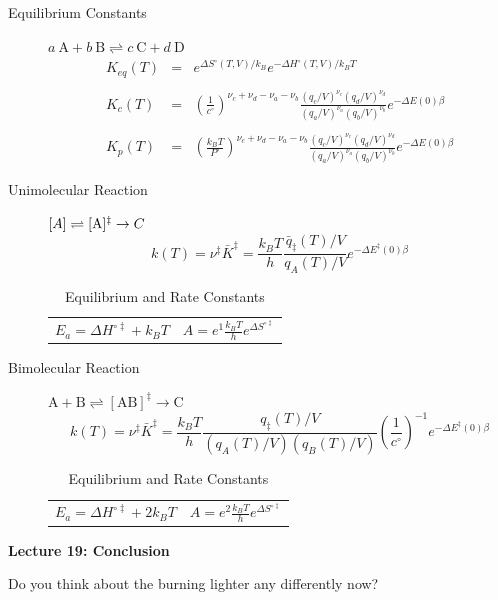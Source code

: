 \message{ !name(Outline.tex)}\documentclass[11pt]{article}
\begin{document}
\begin{outline}
\begin{table} 
\begin{center}
    \caption{\large{Equilibrium and Rate Constants}}
   \begin{description}
   \item[Equilibrium Constants] $a~\text{A} + b~\text{B} \rightleftharpoons c~\text{C} + d~\text{D} $
     \begin{eqnarray*}
       K_{eq}(T) &=& e^{\Delta S^\circ(T,V)/k_B}e^{-\Delta H^\circ(T,V)/k_BT}
       \\ \\ 
            K_c(T) &=&
          \left(\frac{1}{c^\circ}\right)^{\nu_c+\nu_d-\nu_a-\nu_b}\frac{(q_c/V)^{\nu_c}(q_d/V)^{\nu_d}}{(q_a/V)^{\nu_a}(q_b/V)^{\nu_b}}e^{-\Delta
            E(0)\beta}\\ \\
            K_p(T) &=&
          \left(\frac{k_BT}{P^\circ}\right)^{\nu_c+\nu_d-\nu_a-\nu_b}\frac{(q_c/V)^{\nu_c}(q_d/V)^{\nu_d}}{(q_a/V)^{\nu_a}(q_b/V)^{\nu_b}}e^{-\Delta
            E(0)\beta}
\end{eqnarray*}
\item[Unimolecular Reaction] $\text[A] \rightleftharpoons [\text{A} ]^\ddagger
  \rightarrow C$
      \begin{displaymath}
        k(T)=\nu^\ddagger \bar K^\ddagger=\frac{k_B T}{h} \frac{\bar{q}_\ddagger(T)/V}{q_A(T)/V}
          e^{-\Delta E^\ddagger(0)\beta}               
      \end{displaymath}
\begin{center}
      \begin{tabular}{cc}
      $ \displaystyle E_a =\Delta H^{\circ\ddagger}+k_B T $
      & $ \displaystyle A = e^1\frac{k_B T}{h} e^{\Delta S^{\circ\ddagger}} $
      \end{tabular}
\end{center}
\item[Bimolecular Reaction] $
        \mathrm{A} + \mathrm{B} \rightleftharpoons [ \mathrm{AB}]^\ddagger
        \rightarrow \text{C}$
      \begin{displaymath}
        k(T)=\nu^\ddagger \bar K^\ddagger=\frac{k_B T}{h} \frac{q_\ddagger(T)/V}{(q_A(T)/V)(q_B(T)/V)}\left
          (\frac{1}{c^\circ}\right )^{-1}
        e^{-\Delta E^\ddagger(0)\beta}               
      \end{displaymath}
      \begin{center}
        \begin{tabular}{cc}
        $ \displaystyle E_a  =\Delta H^{\circ\ddagger}+2 k_B T $ & $ \displaystyle
        A  = e^2\frac{k_B T}{h} e^{\Delta S^{\circ\ddagger}} $
      \end{tabular}
      \end{center}
   \end{description}
 \end{center}
 \end{table}

\item {\bf Lecture 19: Conclusion}
  \begin{outline}
    \item Do you think about the burning lighter any differently now?  
  \end{outline}

\end{outline}
\end{document}
